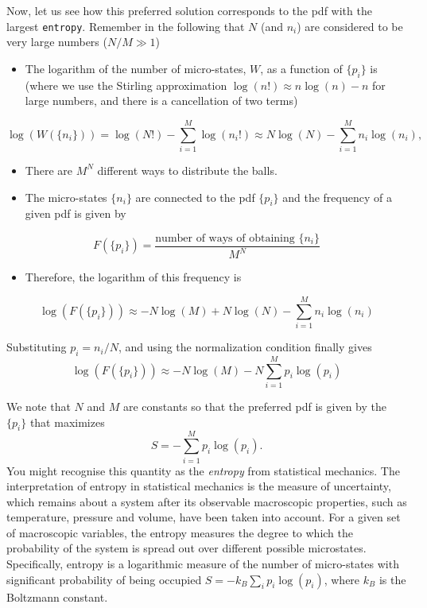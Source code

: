 \documentclass[%
oneside,                 %
final,                   %
10pt]{article}
\begin{document}
\noindent
Now, let us see how this preferred solution corresponds to the pdf with the largest \texttt{entropy}. Remember in the following that $N$ (and $n_i$) are considered to be very large numbers ($N/M \gg 1$)

\begin{itemize}
\item The logarithm of the number of micro-states, $W$, as a function of $\{p_i\}$ is (where we use the Stirling approximation $\log(n!) \approx n\log(n) - n$ for large numbers, and there is a cancellation of two terms)
\end{itemize}

\noindent
\[
\log(W(\{n_i\})) = \log(N!) − \sum_{i=1}^M \log(n_i!) 
\approx N\log(N) - \sum_{i=1}^M n_i\log(n_i),
\]

\begin{itemize}
\item There are $M^N$ different ways to distribute the balls.

\item The micro-states $\{ n_i\}$ are connected to the pdf $\{ p_i \}$ and the frequency of a given pdf is given by
\end{itemize}

\noindent
\[
F(\{p_i\}) = \frac{\text{number of ways of obtaining } \{n_i\}}{M^N}
\]
\begin{itemize}
\item Therefore, the logarithm of this frequency is
\end{itemize}

\noindent
\[
\log(F(\{p_i\})) \approx -N \log(M) + N\log(N) - \sum_{i=1}^M n_i\log(n_i)
\]

Substituting $p_i = n_i/N$, and using the normalization condition finally gives
\[
\log(F(\{p_i\})) \approx -N \log(M) - N \sum_{i=1}^M p_i\log(p_i)
\]

We note that $N$ and $M$ are constants so that the preferred pdf is given by the $\{ p_i \}$ that maximizes
\[
S = - \sum_{i=1}^M p_i\log(p_i).
\]
You might recognise this quantity as the \emph{entropy} from statistical mechanics. The interpretation of entropy in statistical mechanics is the measure of uncertainty, which remains about a system after its observable macroscopic properties, such as temperature, pressure and volume, have been taken into account. For a given set of macroscopic variables, the entropy measures the degree to which the probability of the system is spread out over different possible microstates. Specifically, entropy is a logarithmic measure of the number of micro-states with significant probability of being occupied $S = -k_B \sum_i p_i \log(p_i)$, where $k_B$ is the Boltzmann constant.
\end{document}
